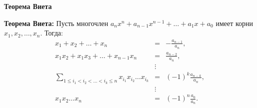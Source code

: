 \documentclass{article}
\begin{document}
    \large

    \begin{center}
        \textbf{Теорема Виета}
    \end{center}

    \textbf{Теорема Виета:} Пусть многочлен $ a_{n}x^n + a_{n-1}x^{n-1} + \ldots + a_{1}x + a_0$ имеет корни $x_1, x_2, \ldots, x_n.$
    Тогда:
    \begin{eqnarray*}
        x_1 + x_2 + \ldots + x_n &=& -\frac{a_{n-1}}{a_n},\\
        x_{1}x_2 + x_{1}x_3 + \ldots + x_{n-1}x_n &=& \frac{a_{n-2}}{a_n}, \\
        &\vdots& \\
        \sum_{1\leq i_1 < i_2 < \ldots < i_k \leqslant n} x_{i_1}x_{i_2}\ldots x_{i_k} &=& (-1)^k\frac{a_{n-k}}{a_n}, \\
        &\vdots& \\
        x_{1}x_2\ldots x_n &=& (-1)^n\frac{a_0}{a_n}.
    \end{eqnarray*}
\end{document}
